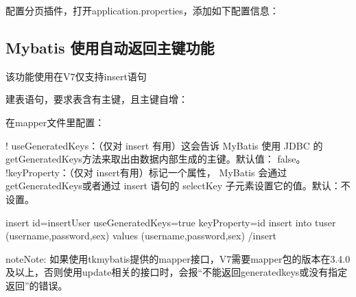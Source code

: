 \documentclass[letterpaper,10pt,english]{sphinxmanual}
\begin{document}
配置分页插件，打开application.properties，添加如下配置信息：

\begin{sphinxVerbatim}[commandchars=\\\{\}]
\end{sphinxVerbatim}


\subsection{Mybatis 使用自动返回主键功能}
\label{\detokenize{interface/mybatis:id1}}
该功能使用在V7仅支持insert语句

建表语句，要求表含有主键，且主键自增：

\begin{sphinxVerbatim}[commandchars=\\\{\}]
          
\end{sphinxVerbatim}

在mapper文件里配置：

\begin{sphinxVerbatim}[commandchars=\\\{\}]
\PYGZlt{}!\PYGZhy{}\PYGZhy{} useGeneratedKeys：（仅对 insert 有用）这会告诉 MyBatis 使用 JDBC 的getGeneratedKeys方法来取出由数据内部生成的主键。默认值： false。 \PYGZhy{}\PYGZhy{}\PYGZgt{}
\PYGZlt{}!\PYGZhy{}\PYGZhy{}keyProperty：（仅对 insert有用）标记一个属性， MyBatis 会通过 getGeneratedKeys或者通过 insert 语句的 selectKey 子元素设置它的值。默认：不设置。 \PYGZhy{}\PYGZhy{}\PYGZgt{}

         \PYGZlt{}insert id=\PYGZdq{}insertUser\PYGZdq{} useGeneratedKeys=\PYGZdq{}true\PYGZdq{} keyProperty=\PYGZdq{}id\PYGZdq{}\PYGZgt{}
                   insert into t\PYGZus{}user (username,password,sex) values
                   (\PYGZsh{}\PYGZob{}username\PYGZcb{},\PYGZsh{}\PYGZob{}password\PYGZcb{},\PYGZsh{}\PYGZob{}sex\PYGZcb{})
         \PYGZlt{}/insert\PYGZgt{}
\end{sphinxVerbatim}

\begin{sphinxadmonition}{note}{Note:}
如果使用tk\sphinxhyphen{}mybatis提供的mapper接口，V7需要mapper包的版本在3.4.0及以上，否则使用update相关的接口时，会报“不能返回generatedkeys或没有指定返回”的错误。
\end{sphinxadmonition}
\end{document}
